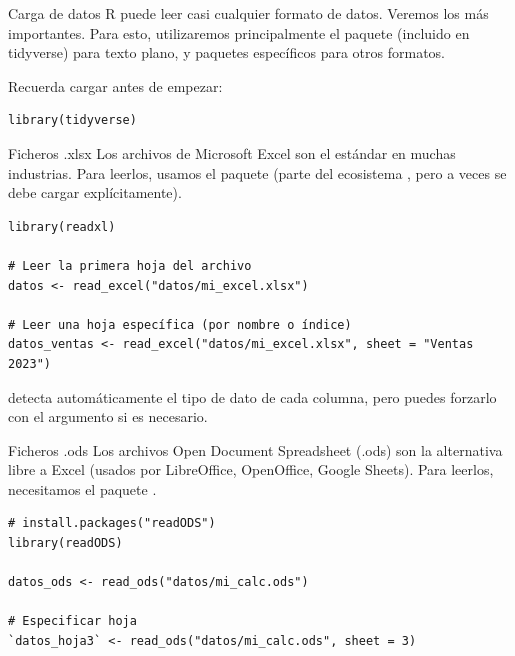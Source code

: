 \documentclass[8pt]{beamer}
\begin{document}
	
	\begin{frame}[fragile]{Carga de datos}
		R puede leer casi cualquier formato de datos. Veremos los más importantes. Para esto, utilizaremos principalmente el paquete  (incluido en tidyverse) para texto plano, y paquetes específicos para otros formatos.
		
		Recuerda cargar  antes de empezar:
\begin{lstlisting}[style=RScript]
library(tidyverse)	
\end{lstlisting}			
	\end{frame}
	

	
	
	\begin{frame}[fragile]{Ficheros .xlsx}
Los archivos de Microsoft Excel son el estándar en muchas industrias. Para leerlos, usamos el paquete  (parte del ecosistema , pero a veces se debe cargar explícitamente).
\begin{lstlisting}[style=RScript]
library(readxl)

# Leer la primera hoja del archivo
datos <- read_excel("datos/mi_excel.xlsx")

# Leer una hoja específica (por nombre o índice)
datos_ventas <- read_excel("datos/mi_excel.xlsx", sheet = "Ventas 2023")	
\end{lstlisting}

 detecta automáticamente el tipo de dato de cada columna, pero puedes forzarlo con el argumento  si es necesario.
	\end{frame}




\begin{frame}[fragile]{Ficheros .ods}
Los archivos Open Document Spreadsheet (.ods) son la alternativa libre a Excel (usados por LibreOffice, OpenOffice, Google Sheets). Para leerlos, necesitamos el paquete .
\begin{lstlisting}[style=RScript]
# install.packages("readODS")
library(readODS)

datos_ods <- read_ods("datos/mi_calc.ods")

# Especificar hoja
`datos_hoja3` <- read_ods("datos/mi_calc.ods", sheet = 3)
\end{lstlisting}
\end{frame}
\end{document}

